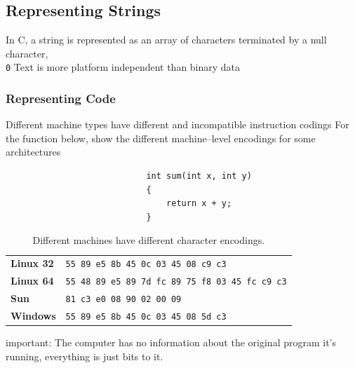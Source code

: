 \documentclass[../bryant_comp_sys.tex]{subfiles}
\begin{document}
            \subsection{Representing Strings}
                \begin{outline}
                    \1 In C, a string is represented as an array of characters terminated by a null character, \texttt{\\0}
                    \1 Text is more platform independent than binary data
                \end{outline}
            
            \subsubsection{Representing Code}
                \begin{outline}
                    \1 Different machine types have different and incompatible instruction codings
                        \2 For the function below,  show the different machine--level encodings for some architectures

                        \lstset{language=C++}
                        \begin{lstlisting}
                            int sum(int x, int y)
                            {
                                return x + y;
                            }
                        \end{lstlisting}
                            
                    \begin{table}[h!]
                        \centering
                        \begin{tabular}{ll}
                            \textbf{Linux 32}   & \texttt{55 89 e5 8b 45 0c 03 45 08 c9 c3}              \\
                            \textbf{Linux 64}   & \texttt{55 48 89 e5 89 7d fc 89 75 f8 03 45 fc c9 c3}  \\
                            \textbf{Sun}        & \texttt{81 c3 e0 08 90 02 00 09}                       \\
                            \textbf{Windows}    & \texttt{55 89 e5 8b 45 0c 03 45 08 5d c3}
                        \end{tabular}
                        \label{tab:encodings}
                        \caption{Different machines have different character encodings.}
                    \end{table}

                    \1 \alert{important}: The computer has no information about the original program it's running, everything is just bits to it.
                \end{outline}
\end{document}
